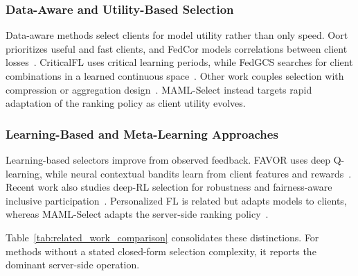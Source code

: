 \documentclass[journal]{IEEEtran}
\newcommand{\revision}[1]{#1}
\begin{document}
\subsubsection{Data-Aware and Utility-Based Selection}
Data-aware methods select clients for model utility rather than only speed. Oort prioritizes useful and fast clients, and FedCor models correlations between client losses~\cite{lai2021oort,tang2022fedcor}. CriticalFL uses critical learning periods, while FedGCS searches for client combinations in a learned continuous space~\cite{yan2023criticalfl,ning2024fedgcs}. Other work couples selection with compression or aggregation design~\cite{xu2024federated,tran2026fedimp}. MAML-Select instead targets rapid adaptation of the ranking policy as client utility evolves.

\subsubsection{Learning-Based and Meta-Learning Approaches}
Learning-based selectors improve from observed feedback. FAVOR uses deep Q-learning, while neural contextual bandits learn from client features and rewards~\cite{wang2020optimizing,pan2024contextual}. Recent work also studies deep-RL selection for robustness and fairness-aware inclusive participation~\cite{kazemi2026robust,arisdakessian2026vox}. Personalized FL is related but adapts models to clients, whereas MAML-Select adapts the server-side ranking policy~\cite{fallah2020personalized}.

\revision{Table~\ref{tab:related_work_comparison} consolidates these distinctions. For methods without a stated closed-form selection complexity, it reports the dominant server-side operation.}
\end{document}
